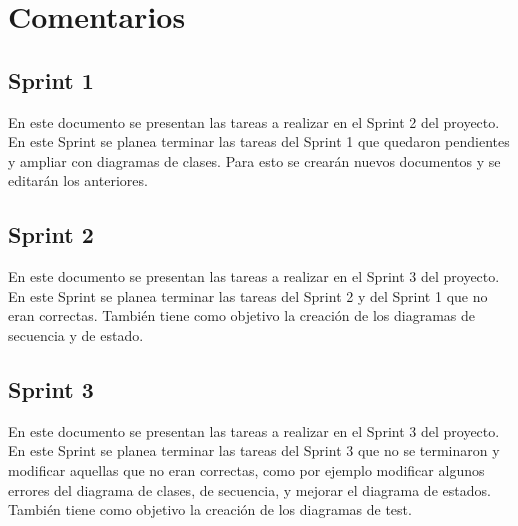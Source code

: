 \section{Comentarios}


\subsection{Sprint 1}

En este documento se presentan las tareas a realizar en el Sprint 2 del proyecto. En este Sprint se planea terminar las tareas del Sprint 1 que quedaron pendientes y ampliar con diagramas de clases. Para esto se crearán nuevos documentos y se editarán los anteriores.


\subsection{Sprint 2}
En este documento se presentan las tareas a realizar en el Sprint 3 del proyecto. En este Sprint se planea terminar las tareas del Sprint 2 y del Sprint 1 que no eran correctas. También tiene como objetivo la creación de los diagramas de secuencia y de estado.


\subsection{Sprint 3}
En este documento se presentan las tareas a realizar en el Sprint 3 del proyecto. En este Sprint se planea terminar las tareas del Sprint 3 que no se terminaron y modificar aquellas que no eran correctas, como por ejemplo modificar algunos errores del diagrama de clases, de secuencia, y mejorar el diagrama de estados. También tiene como objetivo la creación de los diagramas de test.